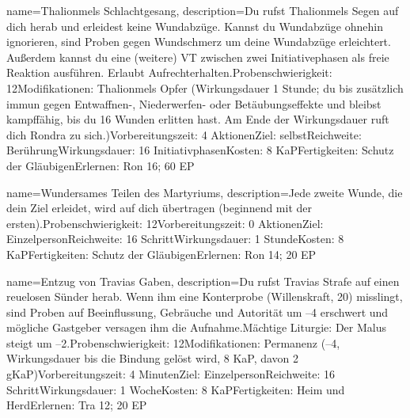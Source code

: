 {
    name={Thalionmels Schlachtgesang},
    description={Du rufst Thalionmels Segen auf dich herab und erleidest keine Wundabzüge. Kannst du Wundabzüge ohnehin ignorieren, sind Proben gegen Wundschmerz um deine Wundabzüge erleichtert. Außerdem kannst du eine (weitere) VT zwischen zwei Initiativephasen als freie Reaktion ausführen. Erlaubt Aufrechterhalten.\newline Probenschwierigkeit: 12\newline Modifikationen: Thalionmels Opfer (Wirkungsdauer 1 Stunde; du bis zusätzlich immun gegen Entwaffnen-, Niederwerfen- oder Betäubungseffekte und bleibst kampffähig, bis du 16 Wunden erlitten hast. Am Ende der Wirkungsdauer ruft dich Rondra zu sich.)\newline Vorbereitungszeit: 4 Aktionen\newline Ziel: selbst\newline Reichweite: Berührung\newline Wirkungsdauer: 16 Initiativphasen\newline Kosten: 8 KaP\newline Fertigkeiten: Schutz der Gläubigen\newline Erlernen: Ron 16; 60 EP}
}


{
    name={Wundersames Teilen des Martyriums},
    description={Jede zweite Wunde, die dein Ziel erleidet, wird auf dich übertragen (beginnend mit der ersten).\newline Probenschwierigkeit: 12\newline Vorbereitungszeit: 0 Aktionen\newline Ziel: Einzelperson\newline Reichweite: 16 Schritt\newline Wirkungsdauer: 1 Stunde\newline Kosten: 8 KaP\newline Fertigkeiten: Schutz der Gläubigen\newline Erlernen: Ron 14; 20 EP}
}


{
    name={Entzug von Travias Gaben},
    description={Du rufst Travias Strafe auf einen reuelosen Sünder herab. Wenn ihm eine Konterprobe (Willenskraft, 20) misslingt, sind Proben auf Beeinflussung, Gebräuche und Autorität um –4 erschwert und mögliche Gastgeber versagen ihm die Aufnahme.\newline Mächtige Liturgie: Der Malus steigt um –2.\newline Probenschwierigkeit: 12\newline Modifikationen: Permanenz (–4, Wirkungsdauer bis die Bindung gelöst wird, 8 KaP, davon 2 gKaP)\newline Vorbereitungszeit: 4 Minuten\newline Ziel: Einzelperson\newline Reichweite: 16 Schritt\newline Wirkungsdauer: 1 Woche\newline Kosten: 8 KaP\newline Fertigkeiten: Heim und Herd\newline Erlernen: Tra 12; 20 EP}
}


